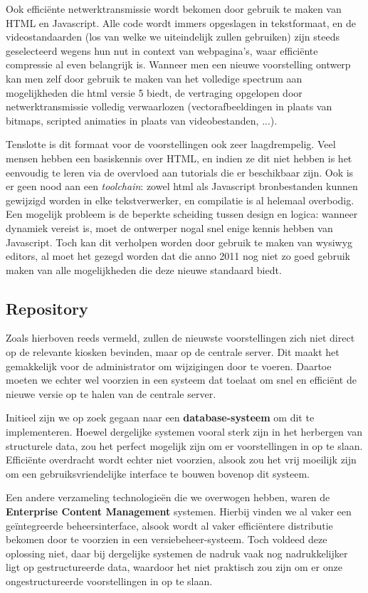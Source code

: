 Ook efficiënte netwerktransmissie wordt bekomen door gebruik te maken van HTML en Javascript. Alle code wordt immers opgeslagen in tekstformaat, en de videostandaarden (los van welke we uiteindelijk zullen gebruiken) zijn steeds geselecteerd wegens hun nut in context van webpagina's, waar efficiënte compressie al even belangrijk is. Wanneer men een nieuwe voorstelling ontwerp kan men zelf door gebruik te maken van het volledige spectrum aan mogelijkheden die \ac{html} versie 5 biedt, de vertraging opgelopen door netwerktransmissie volledig verwaarlozen (vectorafbeeldingen in plaats van bitmaps, scripted animaties in plaats van videobestanden, ...).

Tenslotte is dit formaat voor de voorstellingen ook zeer laagdrempelig. Veel mensen hebben een basiskennis over HTML, en indien ze dit niet hebben is het eenvoudig te leren via de overvloed aan tutorials die er beschikbaar zijn. Ook is er geen nood aan een \emph{toolchain}: zowel \ac{html} als Javascript bronbestanden kunnen gewijzigd worden in elke tekstverwerker, en compilatie is al helemaal overbodig.
Een mogelijk probleem is de beperkte scheiding tussen design en logica: wanneer dynamiek vereist is, moet de ontwerper nogal snel enige kennis hebben van Javascript. Toch kan dit verholpen worden door gebruik te maken van \ac{wysiwyg} editors, al moet het gezegd worden dat die anno 2011 nog niet zo goed gebruik maken van alle mogelijkheden die deze nieuwe standaard biedt.

\subsection{Repository}

Zoals hierboven reeds vermeld, zullen de nieuwste voorstellingen zich niet direct op de relevante kiosken bevinden, maar op de centrale server. Dit maakt het gemakkelijk voor de administrator om wijzigingen door te voeren. Daartoe moeten we echter wel voorzien in een systeem dat toelaat om snel en efficiënt de nieuwe versie op te halen van de centrale server.

Initieel zijn we op zoek gegaan naar een \textbf{database-systeem} om dit te implementeren. Hoewel dergelijke systemen vooral sterk zijn in het herbergen van structurele data, zou het perfect mogelijk zijn om er voorstellingen in op te slaan. Efficiënte overdracht wordt echter niet voorzien, alsook zou het vrij moeilijk zijn om een gebruiksvriendelijke interface te bouwen bovenop dit systeem.

Een andere verzameling technologieën die we overwogen hebben, waren de \textbf{Enterprise Content Management} systemen. Hierbij vinden we al vaker een geïntegreerde beheersinterface, alsook wordt al vaker efficiëntere distributie bekomen door te voorzien in een versiebeheer-systeem. Toch voldeed deze oplossing niet, daar bij dergelijke systemen de nadruk vaak nog nadrukkelijker ligt op gestructureerde data, waardoor het niet praktisch zou zijn om er onze ongestructureerde voorstellingen in op te slaan.

